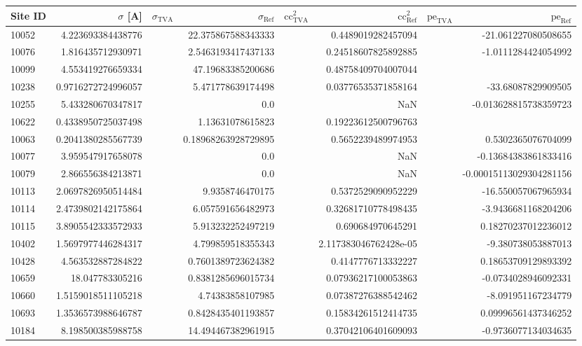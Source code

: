 \begin{tabular}{lrrrrrrr}
\toprule
Site ID & $\sigma$ [A] & $\sigma_\text{TVA}$ & $\sigma_\text{Ref}$ & $\text{cc}^2_\text{TVA}$ & $\text{cc}^2_\text{Ref}$ & $\text{pe}_\text{TVA}$ & $\text{pe}_\text{Ref}$ \\
\midrule
10052 & 4.223693384438776 &  & 22.375867588343333 &  & 0.4489019282457094 &  & -21.061227080508655 \\
10076 & 1.816435712930971 &  & 2.5463193417437133 &  & 0.24518607825892885 &  & -1.0111284424054992 \\
10099 & 4.553419276659334 &  & 47.19683385200686 &  & 0.48758409704007044 &  &  \\
10238 & 0.9716272724996057 &  & 5.471778639174498 &  & 0.03776535371858164 &  & -33.68087829909505 \\
10255 & 5.433280670347817 &  & 0.0 &  & NaN &  & -0.013628815738359723 \\
10622 & 0.4338950725037498 &  & 1.13631078615823 &  & 0.19223612500796763 &  &  \\
10063 & 0.2041380285567739 &  & 0.18968263928729895 &  & 0.5652239489974953 &  & 0.5302365076704099 \\
10077 & 3.959547917658078 &  & 0.0 &  & NaN &  & -0.13684383861833416 \\
10079 & 2.866556384213871 &  & 0.0 &  & NaN &  & -0.00015113029304281156 \\
10113 & 2.0697826950514484 &  & 9.9358746470175 &  & 0.5372529090952229 &  & -16.550057067965934 \\
10114 & 2.4739802142175864 &  & 6.057591656482973 &  & 0.32681710778498435 &  & -3.9436681168204206 \\
10115 & 3.8905542333572933 &  & 5.913232252497219 &  & 0.690684970645291 &  & 0.18270237012236012 \\
10402 & 1.5697977446284317 &  & 4.799859518355343 &  & 2.117383046762428e-05 &  & -9.380738053887013 \\
10428 & 4.563532887284822 &  & 0.7601389723624382 &  & 0.4147776713332227 &  & 0.18653709129893392 \\
10659 & 18.047783305216 &  & 0.8381285696015734 &  & 0.07936217100053863 &  & -0.0734028946092331 \\
10660 & 1.5159018511105218 &  & 4.74383858107985 &  & 0.07387276388542462 &  & -8.091951167234779 \\
10693 & 1.3536573988646787 &  & 0.8428435401193857 &  & 0.15834261512414735 &  & 0.09996561437346252 \\
10184 & 8.198500385988758 &  & 14.494467382961915 &  & 0.37042106401609093 &  & -0.9736077134034635 \\

\end{tabular}
